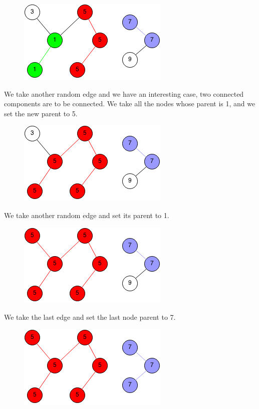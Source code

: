 \documentclass[11pt,oneside]{book}
\makeatletter
\def\maxwidth#1{\ifdim\Gin@nat@width>#1 #1\else\Gin@nat@width\fi}
\makeatother
\begin{document}
\vspace{5px}\begin{figure}[H]\centering
        \includegraphics[width=0.66\maxwidth{\textwidth}]{connectedcomponents5.png}
        \end{figure}

We take another random edge and we have an interesting case, two connected components are to be connected. We take all the nodes whose parent is 1, and we set the new parent to 5.

\vspace{5px}\begin{figure}[H]\centering
        \includegraphics[width=0.66\maxwidth{\textwidth}]{connectedcomponents6.png}
        \end{figure}

We take another random edge and set its parent to 1.

\vspace{5px}\begin{figure}[H]\centering
        \includegraphics[width=0.66\maxwidth{\textwidth}]{connectedcomponents7.png}
        \end{figure}

We take the last edge and set the last node parent to 7.

\vspace{5px}\begin{figure}[H]\centering
        \includegraphics[width=0.66\maxwidth{\textwidth}]{connectedcomponents8.png}
        \end{figure}
\end{document}
